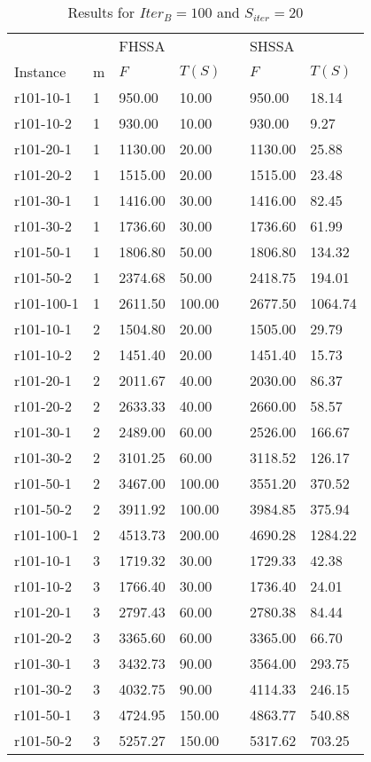 \documentclass[final,5p,times,twocolumn]{elsarticle}
\begin{document}
{{{{{{\renewcommand{\arraystretch}{1.2}
\begin{table}[htbp]
\centering
\caption{Results for $Iter_{B}=100$ and $S_{iter}=20$}
\centering
\begin{tabular}{l l l l l l l}
\hline 
&&\multicolumn{2}{l}{FHSSA}&& \multicolumn{2}{l}{SHSSA}\\
\cline{3-4}\cline{6-7}
Instance & m & $F$ & $T(S)$ && $F$ & $T(S)$\\
\hline
r101-10-1&1&950.00&10.00&&950.00&18.14\\
r101-10-2&1&930.00&10.00&&930.00&9.27\\
r101-20-1&1&1130.00&20.00&&1130.00&25.88\\
r101-20-2&1&1515.00&20.00&&1515.00&23.48\\
r101-30-1&1&1416.00&30.00&&1416.00&82.45\\
r101-30-2&1&1736.60&30.00&&1736.60&61.99\\
r101-50-1&1&1806.80&50.00&&1806.80&134.32\\
r101-50-2&1&2374.68&50.00&&2418.75&194.01\\
r101-100-1&1&2611.50&100.00&&2677.50&1064.74\\
r101-10-1&2&1504.80&20.00&&1505.00&29.79\\
r101-10-2&2&1451.40&20.00&&1451.40&15.73\\
r101-20-1&2&2011.67&40.00&&2030.00&86.37\\
r101-20-2&2&2633.33&40.00&&2660.00&58.57\\
r101-30-1&2&2489.00&60.00&&2526.00&166.67\\
r101-30-2&2&3101.25&60.00&&3118.52&126.17\\
r101-50-1&2&3467.00&100.00&&3551.20&370.52\\
r101-50-2&2&3911.92&100.00&&3984.85&375.94\\
r101-100-1&2&4513.73&200.00&&4690.28&1284.22\\
r101-10-1&3&1719.32&30.00&&1729.33&42.38\\
r101-10-2&3&1766.40&30.00&&1736.40&24.01\\
r101-20-1&3&2797.43&60.00&&2780.38&84.44\\
r101-20-2&3&3365.60&60.00&&3365.00&66.70\\
r101-30-1&3&3432.73&90.00&&3564.00&293.75\\
r101-30-2&3&4032.75&90.00&&4114.33&246.15\\
r101-50-1&3&4724.95&150.00&&4863.77&540.88\\
r101-50-2&3&5257.27&150.00&&5317.62&703.25\\

\end{tabular}
\end{table}}}}}}}
\end{document}
